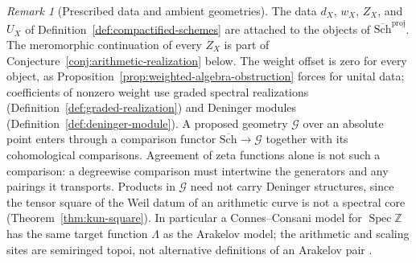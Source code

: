 \documentclass[11pt]{amsart}
\theoremstyle{plain}
\theoremstyle{definition}
\theoremstyle{remark}
\newtheorem{remark}[theorem]{Remark}
\numberwithin{equation}{section}
\newcommand{\Z}{\mathbb{Z}}
\newcommand{\Schbar}{\overline{\mathrm{Sch}}}
\DeclareMathOperator{\Spec}{Spec}
\begin{document}
\begin{remark}[Prescribed data and ambient geometries]
\label{rem:source-data}
The data $d_X$, $w_X$, $Z_X$, and $U_X$ of
Definition~\ref{def:compactified-schemes} are attached to the objects
of $\Schbar^{\mathrm{proj}}$. The meromorphic continuation of every
$Z_X$ is part of Conjecture~\ref{conj:arithmetic-realization} below.
The weight offset is zero for every object, as
Proposition~\ref{prop:weighted-algebra-obstruction} forces for unital
data; coefficients of nonzero weight use graded spectral realizations
(Definition~\ref{def:graded-realization}) and Deninger modules
(Definition~\ref{def:deninger-module}). A proposed geometry $\mathcal G$
over an absolute point enters through a comparison functor
$\Schbar\to\mathcal G$ together with its cohomological comparisons.
Agreement of zeta functions alone is not such a comparison: a
degreewise comparison must intertwine the generators and any pairings
it transports. Products in $\mathcal G$ need not carry Deninger
structures, since the tensor square of the Weil datum of an arithmetic
curve is not a spectral core (Theorem~\ref{thm:kun-square}). In
particular a Connes--Consani model for $\Spec\Z$ has the same target
function $\Lambda$ as the Arakelov model; the arithmetic and scaling
sites are semiringed topoi, not alternative definitions of an Arakelov
pair \cite[\S1, pp.~1--2]{ConnesConsani2015ScalingSite}.
\end{remark}
\end{document}
